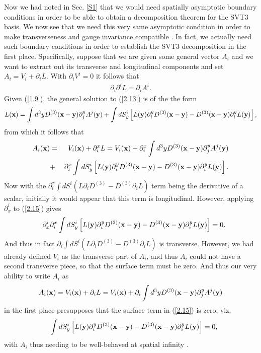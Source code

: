 \documentclass[aps,onecolumn,10pt]{revtex4}
\numberwithin{equation}{section}
\numberwithin{equation}{section}
\begin{document}
Now we had noted in Sec. \ref{S1} that we would need spatially asymptotic boundary conditions in order to be able to obtain a decomposition theorem for the SVT3 basis. We now see that we need this very same asymptotic condition in order to make transverseness and gauge invariance compatible \cite{footnote2}. In fact, we actually need such boundary conditions in order to establish the SVT3 decomposition in the first place. Specifically, suppose that we are given some general vector $A_i$ and we want to extract out its transverse and longitudinal components and set $A_i=V_i+\partial_iL$. With $\partial_iV^i=0$ it follows that
%
\begin{eqnarray}
\partial_i\partial^iL=\partial_iA^i.
\label{2.13}
\end{eqnarray}
%
Given (\ref{1.9}), the general  solution to (\ref{2.13}) is of the the form 
%
\begin{eqnarray}
L({\bf x})=\int d^3yD^{(3)}(\mathbf{x}-\mathbf{y})\partial^y_jA^j({\bf y})+\int dS_y^i\left[L({\bf y})\partial^y_iD^{(3)}(\mathbf{x}-\mathbf{y})-D^{(3)}(\mathbf{x}-\mathbf{y})\partial^y_iL({\bf y})\right],
\label{2.14}
\end{eqnarray}
%
from which it follows that 
%
\begin{eqnarray}
A_i({\bf x})&=&V_i({\bf x})+\partial^x_iL=V_i({\bf x})+\partial^x_i\int d^3yD^{(3)}(\mathbf{x}-\mathbf{y})\partial^y_jA^j({\bf y})
\nonumber\\
&+&\partial^x_i\int dS_y^i\left[L({\bf y})\partial^y_iD^{(3)}(\mathbf{x}-\mathbf{y})-D^{(3)}(\mathbf{x}-\mathbf{y})\partial^y_iL({\bf y})\right].
\label{2.15}
\end{eqnarray}
%
Now with the $\partial^x_i\int dS^i(L\partial_iD^{(3)}-D^{(3)}\partial_iL)$ term being the derivative of a scalar, initially it would appear that this term is longitudinal. However, applying $\partial_x^i$ to (\ref{2.15}) gives 
%
\begin{eqnarray}
&&\partial_x^i\partial^x_i\int dS_y^i\left[L({\bf y})\partial^y_iD^{(3)}(\mathbf{x}-\mathbf{y})-D^{(3)}(\mathbf{x}-\mathbf{y})\partial^y_iL({\bf y})\right]=0.
\label{2.16}
\end{eqnarray}
%
And thus in fact $\partial_i\int dS^i(L\partial_iD^{(3)}-D^{(3)}\partial_iL)$ is transverse. However, we had already defined $V_i$ as the transverse part of $A_i$, and thus $A_i$ could not have a second transverse piece, so that the surface term must be zero. And thus our very ability to write $A_i$ as
%
\begin{eqnarray}
A_i({\bf x})=V_i({\bf x})+\partial_iL=V_i({\bf x})+\partial_i\int d^3yD^{(3)}(\mathbf{x}-\mathbf{y})\partial^y_jA^j({\bf y})
\label{2.17}
\end{eqnarray}
%
in the first place presupposes that the surface term in (\ref{2.15}) is zero, viz.
%
\begin{eqnarray}
&&\int dS_y^i\left[L({\bf y})\partial^y_iD^{(3)}(\mathbf{x}-\mathbf{y})-D^{(3)}(\mathbf{x}-\mathbf{y})\partial^y_iL({\bf y})\right]
=0,
\label{2.18}
\end{eqnarray}
%
with $A_i$ thus needing to be well-behaved at spatial infinity  \cite{footnote3}. 
\end{document}
